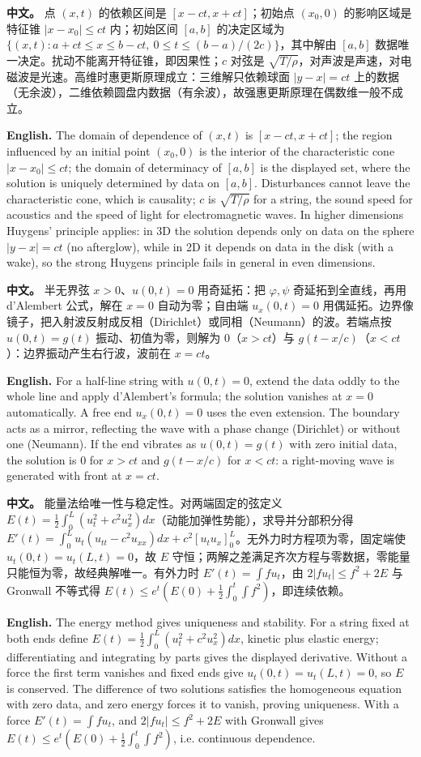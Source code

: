 \documentclass[UTF8,11pt,a4paper]{ctexart}
\newcommand{\APS}[2]{\par\noindent\textbf{中文。} #1\par\noindent\textbf{English.} #2\par\smallskip}
\begin{document}
\APS{点 $(x,t)$ 的依赖区间是 $[x-ct,x+ct]$；初始点 $(x_0,0)$ 的影响区域是特征锥 $|x-x_0|\le ct$ 内；初始区间 $[a,b]$ 的决定区域为 $\{(x,t):a+ct\le x\le b-ct,\ 0\le t\le(b-a)/(2c)\}$，其中解由 $[a,b]$ 数据唯一决定。扰动不能离开特征锥，即因果性；$c$ 对弦是 $\sqrt{T/\rho}$，对声波是声速，对电磁波是光速。高维时惠更斯原理成立：三维解只依赖球面 $|y-x|=ct$ 上的数据（无余波），二维依赖圆盘内数据（有余波），故强惠更斯原理在偶数维一般不成立。}{The domain of dependence of $(x,t)$ is $[x-ct,x+ct]$; the region influenced by an initial point $(x_0,0)$ is the interior of the characteristic cone $|x-x_0|\le ct$; the domain of determinacy of $[a,b]$ is the displayed set, where the solution is uniquely determined by data on $[a,b]$. Disturbances cannot leave the characteristic cone, which is causality; $c$ is $\sqrt{T/\rho}$ for a string, the sound speed for acoustics and the speed of light for electromagnetic waves. In higher dimensions Huygens' principle applies: in 3D the solution depends only on data on the sphere $|y-x|=ct$ (no afterglow), while in 2D it depends on data in the disk (with a wake), so the strong Huygens principle fails in general in even dimensions.}
\APS{半无界弦 $x>0$、$u(0,t)=0$ 用奇延拓：把 $\varphi,\psi$ 奇延拓到全直线，再用 d'Alembert 公式，解在 $x=0$ 自动为零；自由端 $u_x(0,t)=0$ 用偶延拓。边界像镜子，把入射波反射成反相（Dirichlet）或同相（Neumann）的波。若端点按 $u(0,t)=g(t)$ 振动、初值为零，则解为 $0$（$x>ct$）与 $g(t-x/c)$（$x<ct$）：边界振动产生右行波，波前在 $x=ct$。}{For a half-line string with $u(0,t)=0$, extend the data oddly to the whole line and apply d'Alembert's formula; the solution vanishes at $x=0$ automatically. A free end $u_x(0,t)=0$ uses the even extension. The boundary acts as a mirror, reflecting the wave with a phase change (Dirichlet) or without one (Neumann). If the end vibrates as $u(0,t)=g(t)$ with zero initial data, the solution is $0$ for $x>ct$ and $g(t-x/c)$ for $x<ct$: a right-moving wave is generated with front at $x=ct$.}
\APS{能量法给唯一性与稳定性。对两端固定的弦定义 $E(t)=\frac12\int_0^L(u_t^2+c^2u_x^2)dx$（动能加弹性势能），求导并分部积分得 $E'(t)=\int_0^Lu_t(u_{tt}-c^2u_{xx})dx+c^2[u_tu_x]_0^L$。无外力时方程项为零，固定端使 $u_t(0,t)=u_t(L,t)=0$，故 $E$ 守恒；两解之差满足齐次方程与零数据，零能量只能恒为零，故经典解唯一。有外力时 $E'(t)=\int fu_t$，由 $2|fu_t|\le f^2+2E$ 与 Gronwall 不等式得 $E(t)\le e^t(E(0)+\frac12\int_0^t\int f^2)$，即连续依赖。}{The energy method gives uniqueness and stability. For a string fixed at both ends define $E(t)=\frac12\int_0^L(u_t^2+c^2u_x^2)dx$, kinetic plus elastic energy; differentiating and integrating by parts gives the displayed derivative. Without a force the first term vanishes and fixed ends give $u_t(0,t)=u_t(L,t)=0$, so $E$ is conserved. The difference of two solutions satisfies the homogeneous equation with zero data, and zero energy forces it to vanish, proving uniqueness. With a force $E'(t)=\int fu_t$, and $2|fu_t|\le f^2+2E$ with Gronwall gives $E(t)\le e^t(E(0)+\frac12\int_0^t\int f^2)$, i.e. continuous dependence.}
\end{document}
